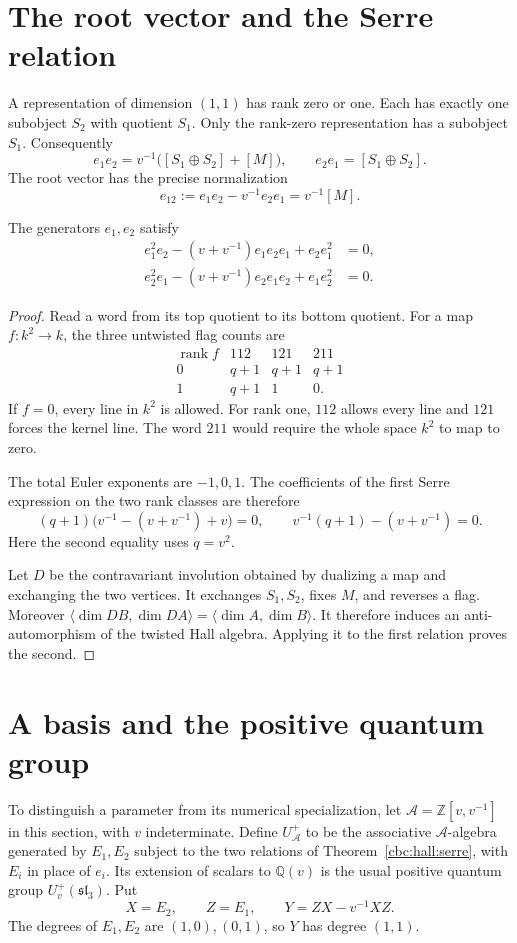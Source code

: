 \section{The root vector and the Serre relation}
A representation of dimension $(1,1)$ has rank zero or one.  Each has exactly
one subobject $S_2$ with quotient $S_1$.  Only the rank-zero representation has
a subobject $S_1$.  Consequently
\[
 e_1e_2=v^{-1}\bigl([S_1\oplus S_2]+[M]\bigr),
 \qquad e_2e_1=[S_1\oplus S_2].
\]
The root vector has the precise normalization
\begin{equation}\label{cbc:hall:root}
 e_{12}:=e_1e_2-v^{-1}e_2e_1=v^{-1}[M].
\end{equation}

\begin{theorem}\label{cbc:hall:serre}
The generators $e_1,e_2$ satisfy
\begin{align*}
 e_1^2e_2-(v+v^{-1})e_1e_2e_1+e_2e_1^2&=0,\\
 e_2^2e_1-(v+v^{-1})e_2e_1e_2+e_1e_2^2&=0.
\end{align*}
\end{theorem}
\begin{proof}
Read a word from its top quotient to its bottom quotient.  For a map
$f:k^2\to k$, the three untwisted flag counts are
\[
\begin{array}{c|ccc}
 \operatorname{rank}f&112&121&211\\ \hline
 0&q+1&q+1&q+1\\
 1&q+1&1&0.
\end{array}
\]
If $f=0$, every line in $k^2$ is allowed.  For rank one, $112$ allows every line and $121$ forces the kernel line.
The word $211$ would require the whole space $k^2$ to map to zero.

The total Euler exponents are $-1,0,1$.
The coefficients of the first Serre expression on the two rank classes are
therefore
\[
 (q+1)\bigl(v^{-1}-(v+v^{-1})+v\bigr)=0,
 \qquad v^{-1}(q+1)-(v+v^{-1})=0.
\]
Here the second equality uses $q=v^2$.

Let $D$ be the contravariant involution obtained by dualizing a map and
exchanging the two vertices.  It exchanges $S_1,S_2$, fixes
$M$, and reverses a flag.  Moreover
$\langle\dim DB,\dim DA\rangle=\langle\dim A,\dim B\rangle$.  It therefore induces an anti-automorphism of the twisted Hall algebra.
Applying it to the first relation proves the second.
\end{proof}

\section{A basis and the positive quantum group}
To distinguish a parameter from its numerical specialization, let
$\mathcal A=\mathbb Z[v,v^{-1}]$ in this section, with $v$ indeterminate.
Define $U_{\mathcal A}^+$ to be the associative $\mathcal A$-algebra generated
by $E_1,E_2$ subject to the two relations of
Theorem~\ref{cbc:hall:serre}, with $E_i$ in place of $e_i$.  Its extension of
scalars to $\mathbb Q(v)$ is the usual positive quantum group
$U_v^+(\mathfrak{sl}_3)$.  Put
\[
 X=E_2,\qquad Z=E_1,\qquad Y=ZX-v^{-1}XZ.
\]
The degrees of $E_1,E_2$ are $(1,0),(0,1)$, so $Y$ has degree $(1,1)$.

